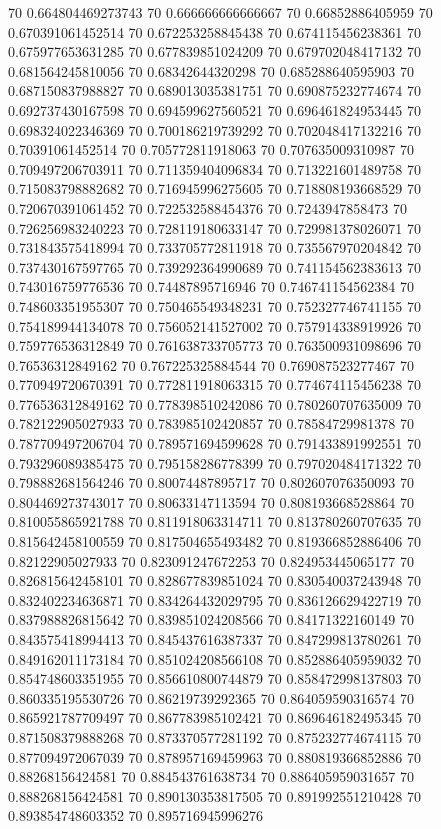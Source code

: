 {70 0.664804469273743
70 0.666666666666667
70 0.66852886405959
70 0.670391061452514
70 0.672253258845438
70 0.674115456238361
70 0.675977653631285
70 0.677839851024209
70 0.679702048417132
70 0.681564245810056
70 0.68342644320298
70 0.685288640595903
70 0.687150837988827
70 0.689013035381751
70 0.690875232774674
70 0.692737430167598
70 0.694599627560521
70 0.696461824953445
70 0.698324022346369
70 0.700186219739292
70 0.702048417132216
70 0.70391061452514
70 0.705772811918063
70 0.707635009310987
70 0.709497206703911
70 0.711359404096834
70 0.713221601489758
70 0.715083798882682
70 0.716945996275605
70 0.718808193668529
70 0.720670391061452
70 0.722532588454376
70 0.7243947858473
70 0.726256983240223
70 0.728119180633147
70 0.729981378026071
70 0.731843575418994
70 0.733705772811918
70 0.735567970204842
70 0.737430167597765
70 0.739292364990689
70 0.741154562383613
70 0.743016759776536
70 0.74487895716946
70 0.746741154562384
70 0.748603351955307
70 0.750465549348231
70 0.752327746741155
70 0.754189944134078
70 0.756052141527002
70 0.757914338919926
70 0.759776536312849
70 0.761638733705773
70 0.763500931098696
70 0.76536312849162
70 0.767225325884544
70 0.769087523277467
70 0.770949720670391
70 0.772811918063315
70 0.774674115456238
70 0.776536312849162
70 0.778398510242086
70 0.780260707635009
70 0.782122905027933
70 0.783985102420857
70 0.78584729981378
70 0.787709497206704
70 0.789571694599628
70 0.791433891992551
70 0.793296089385475
70 0.795158286778399
70 0.797020484171322
70 0.798882681564246
70 0.80074487895717
70 0.802607076350093
70 0.804469273743017
70 0.80633147113594
70 0.808193668528864
70 0.810055865921788
70 0.811918063314711
70 0.813780260707635
70 0.815642458100559
70 0.817504655493482
70 0.819366852886406
70 0.82122905027933
70 0.823091247672253
70 0.824953445065177
70 0.826815642458101
70 0.828677839851024
70 0.830540037243948
70 0.832402234636871
70 0.834264432029795
70 0.836126629422719
70 0.837988826815642
70 0.839851024208566
70 0.84171322160149
70 0.843575418994413
70 0.845437616387337
70 0.847299813780261
70 0.849162011173184
70 0.851024208566108
70 0.852886405959032
70 0.854748603351955
70 0.856610800744879
70 0.858472998137803
70 0.860335195530726
70 0.86219739292365
70 0.864059590316574
70 0.865921787709497
70 0.867783985102421
70 0.869646182495345
70 0.871508379888268
70 0.873370577281192
70 0.875232774674115
70 0.877094972067039
70 0.878957169459963
70 0.880819366852886
70 0.88268156424581
70 0.884543761638734
70 0.886405959031657
70 0.888268156424581
70 0.890130353817505
70 0.891992551210428
70 0.893854748603352
70 0.895716945996276
}
